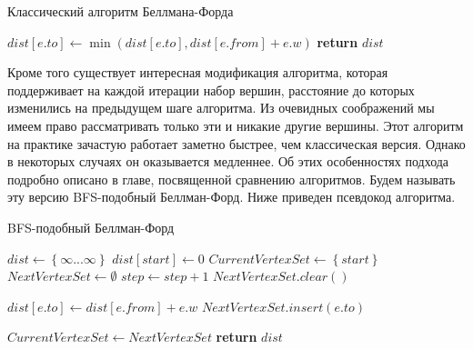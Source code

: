 \FloatBarrier
\begin{algorithm}
\caption{Классический алгоритм Беллмана-Форда}\label{bf_classic_seq}
\begin{algorithmic}[1]
 
		\State $dist[e.to] \gets \min(dist[e.to], dist[e.from] + e.w)$
	\EndFor
\EndFor
\State \textbf{return} $dist$
\EndProcedure
\end{algorithmic}
\end{algorithm}

\FloatBarrier
Кроме того существует интересная модификация алгоритма, которая поддерживает на каждой итерации набор вершин, расстояние до которых изменились на предыдущем шаге алгоритма. Из очевидных соображений мы имеем право рассматривать только эти и никакие другие вершины. Этот алгоритм на практике зачастую работает заметно быстрее, чем классическая версия. Однако в некоторых случаях он оказывается медленнее. Об этих особенностях подхода подробно описано в главе, посвященной сравнению алгоритмов. Будем называть эту версию BFS-подобный Беллман-Форд. Ниже приведен псевдокод алгоритма. 

\FloatBarrier
\begin{algorithm}
\caption{BFS-подобный Беллман-Форд}\label{bf_bfs_seq}
\begin{algorithmic}[1]
\State $dist\gets \left\{ {\infty ... \infty}\right\}$
\State $dist[start] \gets 0$
\State $CurrentVertexSet \gets \left\{ {start}\right\}$ 
\State $NextVertexSet \gets \emptyset$ 
	\State $step \gets step + 1$
	\State $NextVertexSet.clear()$
	
		  
				\State $dist[e.to] \gets dist[e.from] + e.w$
				\State $NextVertexSet.insert(e.to)$								
			\EndIf
		\EndFor
	\EndFor
	
	\State $CurrentVertexSet \gets NextVertexSet$	
\EndWhile
\State \textbf{return} $dist$

\EndProcedure
\end{algorithmic}
\end{algorithm}

